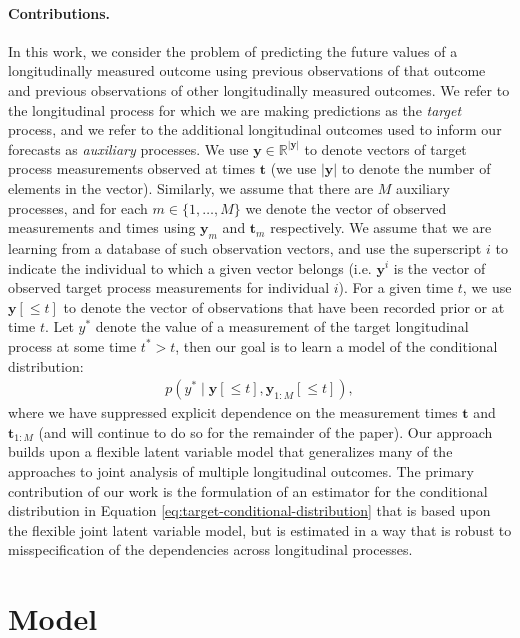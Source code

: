 \documentclass[12pt]{article}
\newcommand{\given}{\mid}
\newcommand{\R}{\mathbb{R}}
\begin{document}
\paragraph{Contributions.}
In this work, we consider the problem of predicting the future values of a longitudinally measured outcome using previous observations of that outcome and previous observations of other longitudinally measured outcomes. We refer to the longitudinal process for which we are making predictions as the \emph{target} process, and we refer to the additional longitudinal outcomes used to inform our forecasts as \emph{auxiliary} processes. We use $\bm{y} \in \R^{|\bm{y}|}$ to denote vectors of target process measurements observed at times $\bm{t}$ (we use $|\bm{y}|$ to denote the number of elements in the vector). Similarly, we assume that there are $M$ auxiliary processes, and for each $m \in \{1, \ldots, M\}$ we denote the vector of observed measurements and times using $\bm{y}_m$ and $\bm{t}_m$ respectively. We assume that we are learning from a database of such observation vectors, and use the superscript $i$ to indicate the individual to which a given vector belongs (i.e. $\bm{y}^i$ is the vector of observed target process measurements for individual $i$). For a given time $t$, we use $\bm{y}[\le t]$ to denote the vector of observations that have been recorded prior or at time $t$. Let $y^*$ denote the value of a measurement of the target longitudinal process at some time $t^* > t$, then our goal is to learn a model of the conditional distribution:
\begin{align}
\label{eq:target-conditional-distribution}
p(y^* \given \bm{y}[\le t], \bm{y}_{1:M}[\le t]),
\end{align}
where we have suppressed explicit dependence on the measurement times $\bm{t}$ and $\bm{t}_{1:M}$ (and will continue to do so for the remainder of the paper). Our approach builds upon a flexible latent variable model that generalizes many of the approaches to joint analysis of multiple longitudinal outcomes. The primary contribution of our work is the formulation of an estimator for the conditional distribution in Equation \ref{eq:target-conditional-distribution} that is based upon the flexible joint latent variable model, but is estimated in a way that is robust to misspecification of the dependencies across longitudinal processes.


\section{Model}
\end{document}
